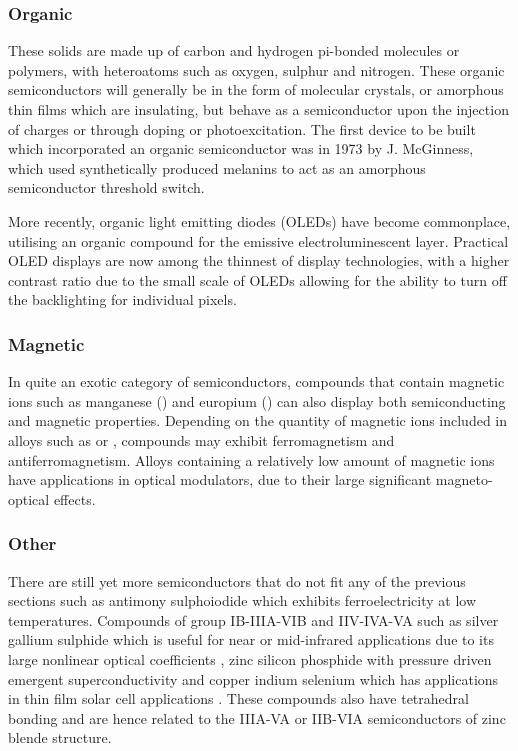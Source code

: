 \subsubsection{Organic}
These solids are made up of carbon and hydrogen pi-bonded molecules or polymers, with heteroatoms such as oxygen, sulphur and nitrogen. These organic semiconductors will generally be in the form of molecular crystals, or amorphous thin films which are insulating, but behave as a semiconductor upon the injection of charges or through doping or photoexcitation. The first device to be built which incorporated an organic semiconductor was in 1973 by J. McGinness, which used synthetically produced melanins to act as an amorphous semiconductor threshold switch.

More recently, organic light emitting diodes (OLEDs) have become commonplace, utilising an organic compound for the emissive electroluminescent layer. Practical OLED displays are now among the thinnest of display technologies, with a higher contrast ratio due to the small scale of OLEDs allowing for the ability to turn off the backlighting for individual pixels.

\subsubsection{Magnetic}
In quite an exotic category of semiconductors, compounds that contain magnetic ions such as manganese () and europium () can also display both semiconducting and magnetic properties. Depending on the quantity of magnetic ions included in alloys such as  \cite{asuigui2020} or  \cite{hossain2015}, compounds may exhibit ferromagnetism and antiferromagnetism. Alloys containing a relatively low amount of magnetic ions have applications in optical modulators, due to their large significant magneto-optical effects. 

\subsubsection{Other}
There are still yet more semiconductors that do not fit any of the previous sections such as antimony sulphoiodide  which exhibits ferroelectricity at low temperatures. Compounds of group IB-IIIA-VIB and IIV-IVA-VA such as silver gallium sulphide  which is useful for near or mid-infrared applications due to its large nonlinear optical coefficients \cite{rudysh2022}, zinc silicon phosphide  with pressure driven emergent superconductivity \cite{yuan2021} and copper indium selenium  which has applications in thin film solar cell applications \cite{haloui2015}. These compounds also have tetrahedral bonding and are hence related to the IIIA-VA or IIB-VIA semiconductors of zinc blende structure.

